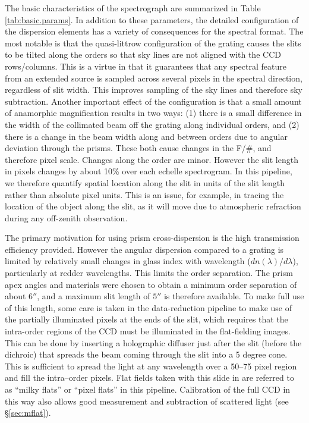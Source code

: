 \documentclass[12pt,preprint]{aastex}
\begin{document}
The basic characteristics of the spectrograph are summarized in Table
\ref{tab:basic.params}.  In addition to these parameters, the detailed
configuration of the dispersion elements has a variety of consequences
for the spectral format.  The most notable is that the quasi-littrow
configuration of the grating causes the slits to be tilted along the
orders so that sky lines are not aligned with the CCD rows/columns.
This is a virtue in that it guarantees that any spectral feature from
an extended source is sampled across several pixels in the spectral
direction, regardless of slit width. This improves sampling of the sky
lines and therefore sky subtraction.  Another important effect of the
configuration is that a small amount of anamorphic magnification
results in two ways: 
(1) there is a small difference in the width of the
collimated beam off the grating along individual orders, and 
(2) there is
a change in the beam width along and between orders due to angular
deviation through the prisms.  These both cause changes in the F/\#,
and therefore pixel scale.  Changes along the order are minor.
However the slit length in pixels changes by about 10\% over 
each echelle spectrogram.  
In this pipeline, we therefore quantify spatial location
along the slit in units of the slit length rather than absolute
pixel units.
This is an issue, for example, in tracing the location of the object
along the slit, as it will move due to atmospheric refraction during
any off-zenith observation.

The primary motivation for using prism cross-dispersion is the high
transmission efficiency provided.  However the angular dispersion
compared to a grating is limited by relatively small changes in glass
index with wavelength ($dn(\lambda)/d\lambda$), particularly at redder
wavelengths. This limits the order separation.  The prism apex angles
and materials were chosen to obtain a minimum order separation of
about $6''$, and a maximum slit length of $5''$ is therefore
available.  To make full use of this length, some care is taken in the
data-reduction pipeline to make 
use of the partially illuminated pixels at the ends
of the slit, which requires that the intra-order regions of the
CCD must be illuminated in the flat-fielding images.  This can be done
by inserting a holographic diffuser just after the slit (before the
dichroic) that spreads the beam coming through the slit into a 5
degree cone. This is sufficient to spread the light at any wavelength
over a 50--75 pixel region and fill the intra--order pixels.  Flat
fields taken with this slide in are referred to as ``milky flats''
or ``pixel flats'' in this pipeline.  Calibration of the
full CCD in this way also allows good measurement and subtraction
of scattered light  (see \S \ref{sec:mflat}).
\end{document}
